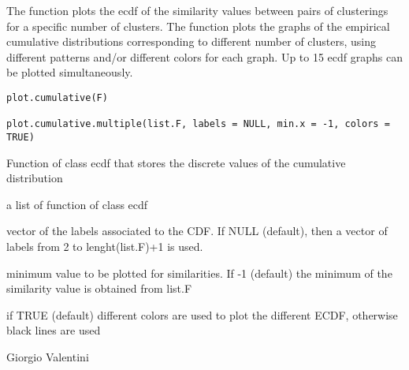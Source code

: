 \documentclass{article}
\begin{document}
\begin{Description}\relax
The function  plots the ecdf of the similarity values between pairs of clusterings for a specific number of clusters.
The function  plots the graphs of the empirical cumulative distributions corresponding to different number of clusters, 
using different patterns and/or different colors for each graph. Up to 15  ecdf graphs can be plotted simultaneously.
\end{Description}
\begin{Usage}
\begin{verbatim}
plot.cumulative(F)

plot.cumulative.multiple(list.F, labels = NULL, min.x = -1, colors = TRUE)
\end{verbatim}
\end{Usage}
\begin{Arguments}
\begin{ldescription}
\item[\code{F}] Function of class ecdf  that stores the discrete values of the cumulative distribution 
\item[\code{list.F}] a list of function of class ecdf 
\item[\code{labels}] vector of the labels associated to the CDF. If  NULL (default), then a vector of labels from 2 to lenght(list.F)+1
is used.
\item[\code{min.x}] minimum value to be plotted for similarities. If -1 (default) the minimum of the similarity value is obtained
from list.F 
\item[\code{colors}] if TRUE (default) different colors are used to plot the different ECDF, otherwise black lines are used 
\end{ldescription}
\end{Arguments}
\begin{Author}\relax
Giorgio Valentini 
\end{Author}
\begin{SeeAlso}\relax
{}
\end{SeeAlso}
\end{document}
